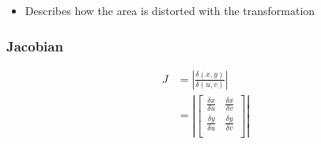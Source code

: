     \begin{itemize}
      \item Describes how the area is distorted with the transformation
    \end{itemize}

    \subsubsection{Jacobian}

      \begin{align}
        J &= \left| \frac{\delta\left( x, y \right)}{\delta\left( u, v \right)} \right| \\
        &=
        \left|
          \begin{bmatrix}
            \frac{\delta x}{\delta u} & \frac{\delta x}{\delta v} \\
            \frac{\delta y}{\delta u} & \frac{\delta y}{\delta v} \\
          \end{bmatrix}
        \right|
      \end{align}